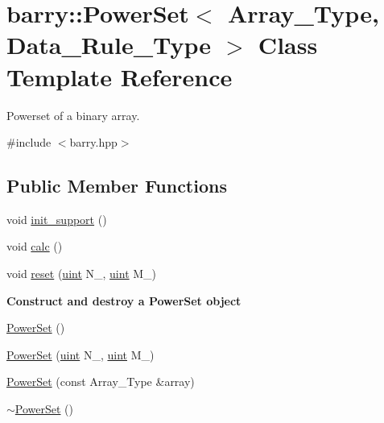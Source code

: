 \hypertarget{classbarry_1_1_power_set}{}\section{barry\+:\+:Power\+Set$<$ Array\+\_\+\+Type, Data\+\_\+\+Rule\+\_\+\+Type $>$ Class Template Reference}
\label{classbarry_1_1_power_set}


Powerset of a binary array.  




{\ttfamily \#include $<$barry.\+hpp$>$}

\subsection*{Public Member Functions}
\begin{DoxyCompactItemize}
\item 
void \hyperlink{classbarry_1_1_power_set_a8eefc9606c6339938a8d9adcd0d7e153}{init\+\_\+support} ()
\item 
void \hyperlink{classbarry_1_1_power_set_ad3b707294498105b2cc1a04017cc96d2}{calc} ()
\item 
void \hyperlink{classbarry_1_1_power_set_aba11dd8802cd2eb529c7c30b55994248}{reset} (\hyperlink{namespacebarry_a11dfc53ddb4672278319aa04f1e09a6c}{uint} N\+\_\+, \hyperlink{namespacebarry_a11dfc53ddb4672278319aa04f1e09a6c}{uint} M\+\_\+)
\end{DoxyCompactItemize}
\begin{Indent}\textbf{ Construct and destroy a Power\+Set object}\par
\begin{DoxyCompactItemize}
\item 
\hyperlink{classbarry_1_1_power_set_ab2fa4e40323bb9225225bb52b86ff345}{Power\+Set} ()
\item 
\hyperlink{classbarry_1_1_power_set_a96a31964644ea81991fe103a2a8bfb1f}{Power\+Set} (\hyperlink{namespacebarry_a11dfc53ddb4672278319aa04f1e09a6c}{uint} N\+\_\+, \hyperlink{namespacebarry_a11dfc53ddb4672278319aa04f1e09a6c}{uint} M\+\_\+)
\item 
\hyperlink{classbarry_1_1_power_set_acc20a68ff11aa1891d9a0676ed50808f}{Power\+Set} (const Array\+\_\+\+Type \&array)
\item 
\hyperlink{classbarry_1_1_power_set_a89a176c9517e81a066adffad3c46aba5}{$\sim$\+Power\+Set} ()
\end{DoxyCompactItemize}
\end{Indent}
